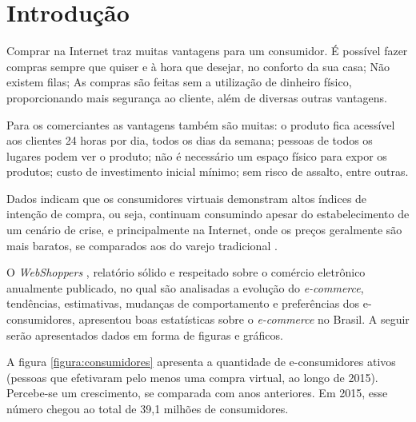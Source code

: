 \documentclass[a4paper,12pt]{monografia}
\renewcommand{\tablename}{Quadro}
\begin{document}
{%
\let\oldnumberline\numberline%
\renewcommand{\numberline}{\tablename~\oldnumberline}%
\listoftables%
\thispagestyle{empty}
}

\tableofcontents
\thispagestyle{empty}
% 
\chapter{Introdução} %
\label{cha:intro}

Comprar na Internet traz muitas vantagens para um consumidor. É possível fazer compras sempre que quiser e à hora que desejar, no conforto da sua casa; Não existem filas; As compras são feitas sem a utilização de dinheiro físico, proporcionando mais segurança ao cliente, além de diversas outras vantagens.

Para os comerciantes as vantagens também são muitas: o produto fica acessível aos clientes 24 horas por dia, todos os dias da semana; pessoas de todos os lugares podem ver o produto; não é necessário um espaço físico para expor os produtos; custo de investimento inicial mínimo; sem risco de assalto, entre outras.

Dados indicam que os consumidores virtuais demonstram altos índices de intenção de compra, ou seja, continuam consumindo apesar do estabelecimento de um cenário de crise, e principalmente na Internet, onde os preços geralmente são mais baratos, se comparados aos do varejo tradicional \cite{webshoppers}.

O \textit{WebShoppers} , relatório sólido e respeitado sobre o comércio eletrônico anualmente publicado, no qual são analisadas a evolução do \textit{e-commerce}, tendências, estimativas, mudanças de comportamento e preferências dos e-consumidores, apresentou boas estatísticas sobre o \textit{e-commerce} no Brasil. A seguir serão apresentados dados em forma de figuras e gráficos.

A figura \ref{figura:consumidores} apresenta a quantidade de e-consumidores ativos (pessoas que efetivaram pelo
menos uma compra virtual, ao longo de 2015). Percebe-se um crescimento, se comparada com anos anteriores. Em 2015, esse número chegou ao total de 39,1 milhões de consumidores.
\end{document}
